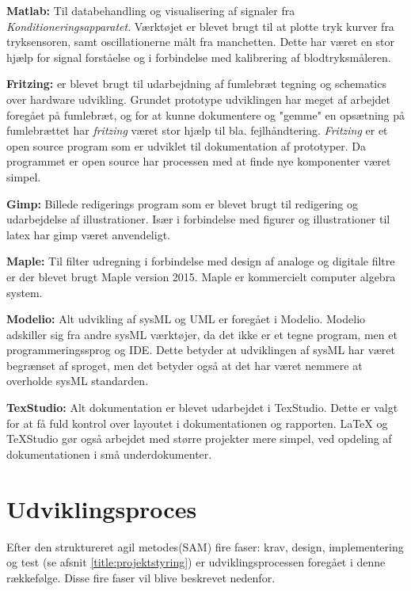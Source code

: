 \textbf{Matlab:} Til databehandling og visualisering af signaler fra \textit{Konditioneringsapparatet}. Værktøjet er blevet brugt til at plotte tryk kurver fra tryksensoren, samt oscillationerne målt fra manchetten. Dette har været en stor hjælp for signal forståelse og i forbindelse med kalibrering af blodtryksmåleren. 

\textbf{Fritzing:} er blevet brugt til udarbejdning af fumlebræt tegning og schematics over hardware udvikling. Grundet prototype udviklingen har meget af arbejdet foregået på fumlebræt, og for at kunne dokumentere og "gemme" en opsætning på fumlebrættet har \textit{fritzing} været stor hjælp til bla. fejlhåndtering. \textit{Fritzing} er et open source program som er udviklet til dokumentation af prototyper. Da programmet er open source har processen med at finde nye komponenter været simpel. 

\textbf{Gimp:} Billede redigerings program som er blevet brugt til redigering og udarbejdelse af illustrationer. Især i forbindelse med figurer og illustrationer til latex har gimp været anvendeligt. 

\textbf{Maple:} Til filter udregning i forbindelse med design af analoge og digitale filtre er der blevet brugt Maple version 2015. Maple er kommercielt computer algebra system. 

\textbf{Modelio:} Alt udvikling af sysML og UML er foregået i Modelio. Modelio adskiller sig fra andre sysML værktøjer, da det ikke er et tegne program, men et programmeringssprog og IDE. Dette betyder at udviklingen af sysML har været begrænset af sproget, men det betyder også at det har været nemmere at overholde sysML standarden. 

\textbf{TexStudio:} Alt dokumentation er blevet udarbejdet i TexStudio. Dette er valgt for at få fuld kontrol over layoutet i dokumentationen og rapporten. LaTeX og TeXStudio gør også arbejdet med større projekter mere simpel, ved opdeling af dokumentationen i små underdokumenter.


\section{Udviklingsproces} \label{title:udviklingMetode}
Efter den struktureret agil metodes(SAM) fire faser: krav, design, implementering og test (se afsnit \ref{title:projektstyring}) er udviklingsprocessen foregået i denne rækkefølge. Disse fire faser vil blive beskrevet nedenfor.

